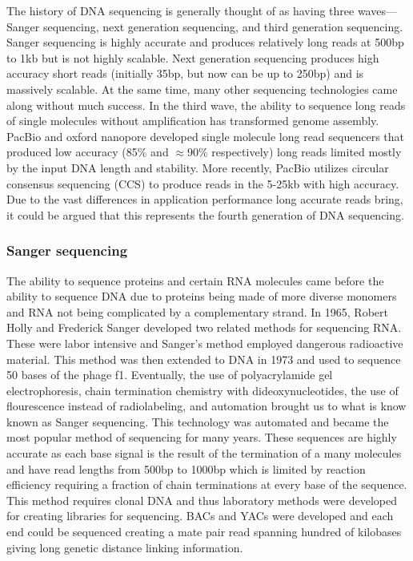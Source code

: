 \par{
The history of DNA sequencing is generally thought of as having three waves---Sanger sequencing, next generation sequencing, and third generation sequencing. Sanger sequencing is highly accurate and produces relatively long reads at 500bp to 1kb but is not highly scalable. Next generation sequencing produces high accuracy short reads (initially 35bp, but now can be up to 250bp) and is massively scalable. At the same time, many other sequencing technologies came along without much success. In the third wave, the ability to sequence long reads of single molecules without amplification has transformed genome assembly. PacBio and oxford nanopore developed single molecule long read sequencers that produced low accuracy (85\% and $\approx$90\% respectively) long reads limited mostly by the input DNA length and stability. More recently, PacBio utilizes circular consensus sequencing (CCS) to produce reads in the 5-25kb with high accuracy. Due to the vast differences in application performance long accurate reads bring, it could be argued that this represents the fourth generation of DNA sequencing.
}

\subsubsection{Sanger sequencing}\label{section:sanger}

\par{
The ability to sequence proteins and certain RNA molecules came before the ability to sequence DNA due to proteins being made of more diverse monomers and RNA not being complicated by a complementary strand\cite{aminoacidsequence}\cite{sequenceofsequencers}. In 1965, Robert Holly and Frederick Sanger developed two related methods for sequencing RNA\cite{Holly1}\cite{Sanger1}. These were labor intensive and Sanger's method employed dangerous radioactive material. This method was then extended to DNA in 1973 and used to sequence 50 bases of the phage f1\cite{Sanger2}. Eventually, the use of polyacrylamide gel electrophoresis, chain termination chemistry with dideoxynucleotides, the use of flourescence instead of radiolabeling, and automation brought us to what is know known as Sanger sequencing\cite{Sanger3}. This technology was automated and became the most popular method of sequencing for many years\cite{Hunkapiller1991}. These sequences are highly accurate as each base signal is the result of the termination of a many molecules and have read lengths from 500bp to 1000bp which is limited by reaction efficiency requiring a fraction of chain terminations at every base of the sequence. This method requires clonal DNA and thus laboratory methods were developed for creating libraries for sequencing. BACs and YACs \cite{BACsYACs} were developed and each end could be sequenced creating a mate pair read spanning hundred of kilobases giving long genetic distance linking information.
}

